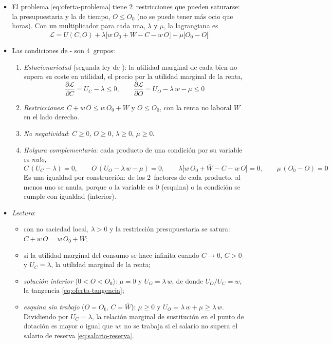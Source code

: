 \documentclass[11pt]{article}
\begin{document}
\begin{itemize}
\item El problema \eqref{eq:oferta-problema} tiene 2~restricciones que pueden saturarse: la presupuestaria y la de tiempo, $O\leq O_0$ (no se puede tener más ocio que horas). Con un multiplicador para cada una, $\lambda$ y $\mu$, la lagrangiana es
  \[
  \mathcal{L}=U(C,O)+\lambda\big[w\,O_0+\overline{W}-C-w\,O\big]+\mu\big[O_0-O\big]
  \]
\item Las condiciones de - son 4~grupos:
  \begin{enumerate}
  \item \emph{Estacionariedad} (segunda ley de ): la utilidad marginal de cada bien no supera su coste en utilidad, el precio por la utilidad marginal de la renta,
    \[
    \frac{\partial\mathcal{L}}{\partial C}=U_C-\lambda\leq 0,\qquad \frac{\partial\mathcal{L}}{\partial O}=U_O-\lambda\,w-\mu\leq 0
    \]
  \item \emph{Restricciones}: $C+w\,O\leq w\,O_0+\overline{W}$ y $O\leq O_0$, con la renta no laboral $\overline{W}$ en el lado derecho.
  \item \emph{No negatividad}: $C\geq 0$, $O\geq 0$, $\lambda\geq 0$, $\mu\geq 0$.
  \item \emph{Holgura complementaria}: cada producto de una condición por su variable es \emph{nulo},
    \[
    C\,(U_C-\lambda)=0,\qquad O\,(U_O-\lambda\,w-\mu)=0,\qquad \lambda\big[w\,O_0+\overline{W}-C-w\,O\big]=0,\qquad \mu\,(O_0-O)=0
    \]
    Es una igualdad por construcción: de los 2~factores de cada producto, al menos uno se anula, porque o la variable es 0 (esquina) o la condición se cumple con igualdad (interior).
  \end{enumerate}
\item \emph{Lectura}:
  \begin{itemize}
  \item con no saciedad local, $\lambda>0$ y la restricción presupuestaria se satura: $C+w\,O=w\,O_0+\overline{W}$;
  \item si la utilidad marginal del consumo se hace infinita cuando $C\to 0$, $C>0$ y $U_C=\lambda$, la utilidad marginal de la renta;
  \item \emph{solución interior} ($0<O<O_0$): $\mu=0$ y $U_O=\lambda\,w$, de donde $U_O/U_C=w$, la tangencia \eqref{eq:oferta-tangencia};
  \item \emph{esquina sin trabajo} ($O=O_0$, $C=\overline{W}$): $\mu\geq 0$ y $U_O=\lambda\,w+\mu\geq\lambda\,w$. Dividiendo por $U_C=\lambda$, la relación marginal de sustitución en el punto de dotación es mayor o igual que $w$: no se trabaja si el salario no supera el salario de reserva \eqref{eq:salario-reserva}.
  \end{itemize}
\end{itemize}
\end{document}
